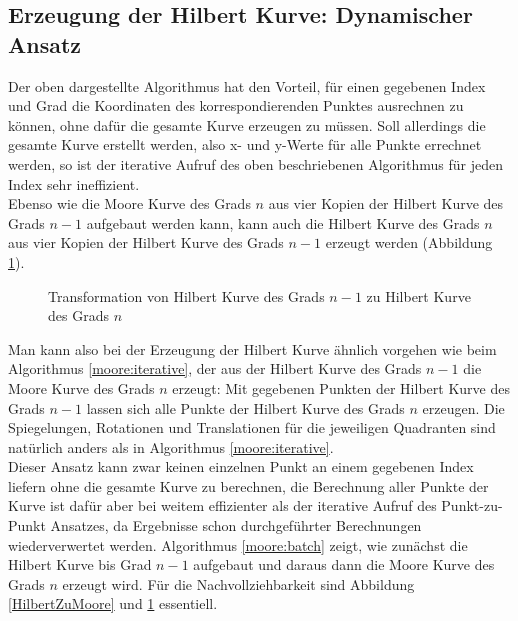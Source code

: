 \documentclass[course=erap]{aspdoc}
\begin{document}
\FloatBarrier
\subsection{Erzeugung der Hilbert Kurve: Dynamischer Ansatz}
Der oben dargestellte Algorithmus hat den Vorteil, für einen gegebenen Index und Grad die Koordinaten des korrespondierenden Punktes ausrechnen zu können, ohne dafür die gesamte Kurve erzeugen zu müssen.
Soll allerdings die gesamte Kurve erstellt werden, also x- und y-Werte für alle Punkte errechnet werden, so ist der iterative Aufruf des oben beschriebenen Algorithmus für jeden Index sehr ineffizient.\\
Ebenso wie die Moore Kurve des Grads $n$ aus vier Kopien der Hilbert Kurve des Grads $n-1$ aufgebaut werden kann, kann auch die Hilbert Kurve des Grads $n$ aus vier Kopien der Hilbert Kurve des Grads $n-1$ erzeugt werden (Abbildung \ref{HilbertZuHilbert}).
\begin{figure}[h]
\centering
\def\svgwidth{240pt}

\caption{Transformation von Hilbert Kurve des Grads $n-1$ zu Hilbert Kurve des Grads $n$}
\label{HilbertZuHilbert}
\end{figure}
Man kann also bei der Erzeugung der Hilbert Kurve ähnlich vorgehen wie beim Algorithmus \ref{moore:iterative}, der aus der Hilbert Kurve des Grads $n-1$ die Moore Kurve des Grads $n$ erzeugt: Mit gegebenen Punkten der Hilbert Kurve des Grads $n-1$ lassen sich alle Punkte der Hilbert Kurve des Grads $n$ erzeugen. 
Die Spiegelungen, Rotationen und Translationen für die jeweiligen Quadranten sind natürlich anders als in Algorithmus \ref{moore:iterative}. \\
Dieser Ansatz kann zwar keinen einzelnen Punkt an einem gegebenen Index liefern ohne die gesamte Kurve zu berechnen,  die Berechnung aller Punkte der Kurve ist dafür aber bei weitem effizienter als der iterative Aufruf des Punkt-zu-Punkt Ansatzes, da Ergebnisse schon durchgeführter Berechnungen wiederverwertet werden. Algorithmus \ref{moore:batch} zeigt, wie zunächst die Hilbert Kurve bis Grad $n-1$ aufgebaut und daraus dann die Moore Kurve des Grads $n$ erzeugt wird. Für die Nachvollziehbarkeit sind Abbildung \ref{HilbertZuMoore} und \ref{HilbertZuHilbert} essentiell.


\FloatBarrier
\end{document}
